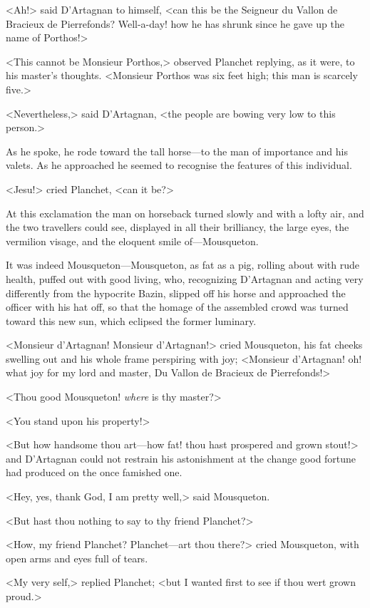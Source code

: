 <Ah!> said D'Artagnan to himself, <can this be the Seigneur du Vallon de Bracieux de Pierrefonds? Well-a-day! how he has shrunk since he gave up the name of Porthos!>

<This cannot be Monsieur Porthos,> observed Planchet replying, as it were, to his master's thoughts. <Monsieur Porthos was six feet high; this man is scarcely five.>

<Nevertheless,> said D'Artagnan, <the people are bowing very low to this person.>

As he spoke, he rode toward the tall horse—to the man of importance and his valets. As he approached he seemed to recognise the features of this individual.

<Jesu!> cried Planchet, <can it be?>

At this exclamation the man on horseback turned slowly and with a lofty air, and the two travellers could see, displayed in all their brilliancy, the large eyes, the vermilion visage, and the eloquent smile of—Mousqueton.

It was indeed Mousqueton—Mousqueton, as fat as a pig, rolling about with rude health, puffed out with good living, who, recognizing D'Artagnan and acting very differently from the hypocrite Bazin, slipped off his horse and approached the officer with his hat off, so that the homage of the assembled crowd was turned toward this new sun, which eclipsed the former luminary.

<Monsieur d'Artagnan! Monsieur d'Artagnan!> cried Mousqueton, his fat cheeks swelling out and his whole frame perspiring with joy; <Monsieur d'Artagnan! oh! what joy for my lord and master, Du Vallon de Bracieux de Pierrefonds!>

<Thou good Mousqueton! \textit{where} is thy master?>

<You stand upon his property!>

<But how handsome thou art—how fat! thou hast prospered and grown stout!> and D'Artagnan could not restrain his astonishment at the change good fortune had produced on the once famished one.

<Hey, yes, thank God, I am pretty well,> said Mousqueton.

<But hast thou nothing to say to thy friend Planchet?>

<How, my friend Planchet? Planchet—art thou there?> cried Mousqueton, with open arms and eyes full of tears.

<My very self,> replied Planchet; <but I wanted first to see if thou wert grown proud.>


